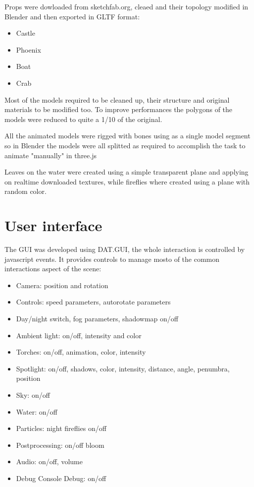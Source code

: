 \documentclass[10pt,a4paper]{article}
\begin{document}
Props were dowloaded from sketchfab.org, cleaed and their topology modified in Blender and then exported in GLTF format:

\begin{itemize}
 \item Castle
 \item Phoenix
 \item Boat
 \item Crab
\end{itemize}

Most of the models required to be cleaned up, their structure and original materials to be modified too. To improve performances the polygons of the models were reduced to quite a 1/10 of the original.

All the animated models were rigged with bones using as a single model  segment so in Blender the models were all splitted as required to accomplish the task to animate "manually" in three.js

Leaves on the water were created using a simple transparent plane and applying on realtime downloaded textures, while fireflies where created using a plane with random color.

\section{User interface}

The GUI was developed using DAT.GUI, the whole interaction is controlled by javascript events. It provides controls to manage mosto of the common interactions aspect of the scene:
 
 \begin{itemize}
 \item Camera: position and rotation
 \item Controls: speed parameters, autorotate parameters
 \item Day/night switch, fog parameters, shadowmap on/off
 \item Ambient light: on/off, intensity and color
 \item Torches: on/off, animation, color, intensity
 \item Spotlight: on/off, shadows, color, intensity, distance, angle, penumbra, position
 \item Sky: on/off
 \item Water: on/off
 \item Particles: night fireflies on/off
 \item Postprocessing: on/off bloom
 \item Audio: on/off, volume
 \item Debug Console Debug: on/off
 \end{itemize}
 
\end{document}
